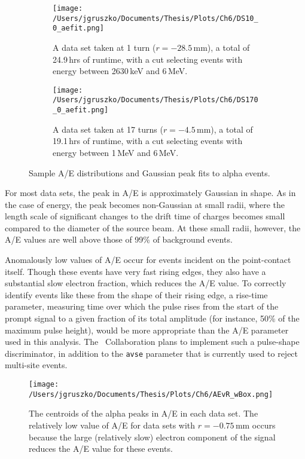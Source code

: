 \begin{figure*}[]
 \centering
 \begin{subfigure}[t]{.45\textwidth}
 \texttt{[image: /Users/jgruszko/Documents/Thesis/Plots/Ch6/DS10\_0\_aefit.png]}
 \caption{A data set taken at 1 turn ($r=-28.5$\,mm), a total of 24.9\,hrs of runtime, with a cut selecting events with energy between 2630\,keV and 6\,MeV.}
\end{subfigure}
\hfill
 \begin{subfigure}[t]{.45\textwidth}
 \texttt{[image: /Users/jgruszko/Documents/Thesis/Plots/Ch6/DS170\_0\_aefit.png]}
  \caption{A data set taken at 17 turns ($r=-4.5$\,mm), a total of 19.1\,hrs of runtime, with a cut selecting events with energy between 1\,MeV and 6\,MeV.} 
\end{subfigure}
\caption[Sample A/E distributions and Gaussian peak fits to alpha events]{Sample A/E distributions and Gaussian peak fits to alpha events.}
 \label{fig:AE_fits}
\end{figure*}

For most data sets, the peak in A/E is approximately Gaussian in shape. As in the case of energy, the peak becomes non-Gaussian at small radii, where the length scale of significant changes to the drift time of charges becomes small compared to the diameter of the source beam. At these small radii, however, the A/E values are well above those of 99\% of background events. 

Anomalously low values of A/E occur for events incident on the point-contact itself. Though these events have very fast rising edges, they also have a substantial slow electron fraction, which reduces the A/E value. To correctly identify events like these from the shape of their rising edge, a rise-time parameter, measuring time over which the pulse rises from the start of the prompt signal to a given fraction of its total amplitude (for instance, 50\% of the maximum pulse height), would be more appropriate than the A/E parameter used in this analysis. The \MJ\ Collaboration plans to implement such a pulse-shape discriminator, in addition to the {\tt avse} parameter that is currently used to reject multi-site events.

\begin{figure}[t]
 \centering
 \texttt{[image: /Users/jgruszko/Documents/Thesis/Plots/Ch6/AEvR\_wBox.png]}
 \caption[The results of fits to A/E in each data set]{The centroids of the alpha peaks in A/E in each data set. The relatively low value of A/E for data sets with $r=-0.75$\,mm occurs because the large (relatively slow) electron component of the signal reduces the A/E value for these events.} 
 \label{fig:AEfit_mu}
\end{figure}

